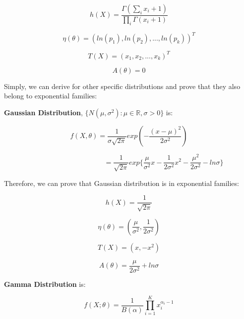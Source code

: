 \documentclass{article} %
\begin{document}
\begin{equation}
h(X)= \frac{\Gamma ( \sum_{i} {x_{i}} + 1)}
{\prod_{i} \Gamma (x_{i} + 1)}
\end{equation}

\begin{equation}
\eta (\theta) = (ln(p_1), ln(p_2),..., ln(p_k))^T
\end{equation}

\begin{equation}
T(X) = (x_1, x_2,..., x_k)^T
\end{equation}

\begin{equation}
A(\theta) = 0
\end{equation}

Simply, we can derive for other specific distributions and prove that they also
belong to exponential families:

\textbf{Gaussian Distribution}, ${ \{ N( \mu, \sigma^2): \mu \in \mathbb{R},
\sigma > 0 \} }$ is:

\begin{equation}
f(X, \theta) = \frac{1}{\sigma \sqrt{2 \pi}} exp(- \frac{(x - \mu)^2}{2 \sigma^2})
\end{equation}

\begin{equation}
\qquad \qquad \qquad \qquad \qquad
= \frac{1}{\sqrt{2 \pi}} exp \{ \frac{\mu}{\sigma^2} x - \frac{1}{2 \sigma^2} x^2 -
\frac{\mu^2}{2 \sigma^2} - ln \sigma\}
\end{equation}

Therefore, we can prove that Gaussian distribution is in exponential families:

\begin{equation}
h(X) = \frac{1}{\sqrt{2 \pi}}
\end{equation}

\begin{equation}
\eta(\theta) = (\frac{\mu}{\sigma^2}, \frac{1}{2 \sigma^2})
\end{equation}

\begin{equation}
T(X) = (x, -x^2)
\end{equation}

\begin{equation}
A(\theta) = \frac{\mu}{2 \sigma^2} + ln \sigma
\end{equation}

\textbf{Gamma Distribution} is:

\begin{equation}
f (X; \theta) = \frac{1}{B( \alpha )} \prod_{i=1}^K x_i^{\alpha_i - 1}
\end{equation}
\end{document}
